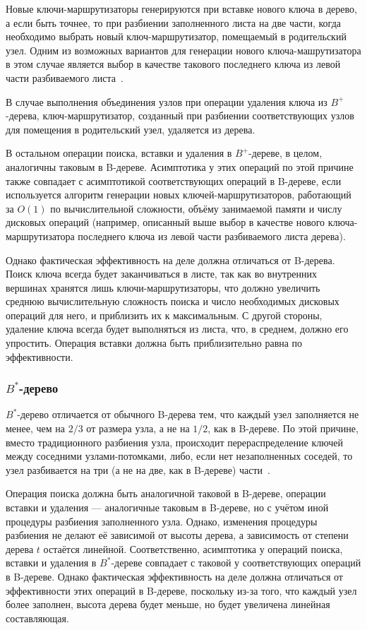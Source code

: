 \documentclass[a4paper,12pt]{article}
\begin{document}
	Новые ключи-маршрутизаторы генерируются при вставке нового ключа в дерево, а если быть точнее, то при разбиении заполненного листа на две части, когда необходимо выбрать новый ключ-маршрутизатор, помещаемый в родительский узел. Одним из возможных вариантов для генерации нового ключа-машрутизатора в этом случае является выбор в качестве такового последнего ключа из левой части разбиваемого листа~\cite{Kerttu}.
	
	В случае выполнения объединения узлов при операции удаления ключа из $B^+$-дерева, ключ-маршрутизатор, созданный при разбиении соответствующих узлов для помещения в родительский узел, удаляется из дерева.
	
	В остальном операции поиска, вставки и удаления в $B^+$-дереве, в целом, аналогичны таковым в B-дереве. Асимптотика у этих операций по этой причине также совпадает с асимптотикой соответствующих операций в B-дереве, если используется алгоритм генерации новых ключей-маршрутизаторов, работающий за $O(1)$ по вычислительной сложности, объёму занимаемой памяти и числу дисковых операций (например, описанный выше выбор в качестве нового ключа-маршрутизатора последнего ключа из левой части разбиваемого листа дерева).
	
	Однако фактическая эффективность на деле должна отличаться от B-дерева. Поиск ключа всегда будет заканчиваться в листе, так как во внутренних вершинах хранятся лишь ключи-маршрутизаторы, что должно увеличить среднюю вычислительную сложность поиска и число необходимых дисковых операций для него, и приблизить их к максимальным. С другой стороны, удаление ключа всегда будет выполняться из листа, что, в среднем, должно его упростить. Операция вставки должна быть приблизительно равна по эффективности.
	
	\subsubsection{$B^*$-дерево}
	
	$B^*$-дерево отличается от обычного B-дерева тем, что каждый узел заполняется не менее, чем на $2/3$ от размера узла, а не на $1/2$, как в B-дереве. По этой причине, вместо традиционного разбиения узла, происходит перераспределение ключей между соседними узлами-потомками, либо, если нет незаполненных соседей, то узел разбивается на три (а не на две, как в B-дереве) части~\cite{Nist}.
	
	Операция поиска должна быть аналогичной таковой в B-дереве, операции вставки и удаления --- аналогичные таковым в B-дереве, но с учётом иной процедуры разбиения заполненного узла. Однако, изменения процедуры разбиения не делают её зависимой от высоты дерева, а зависимость от степени дерева $t$ остаётся линейной. Соответственно, асимптотика у операций поиска, вставки и удаления в $B^*$-дереве совпадает с таковой у соответствующих операций в B-дереве. Однако фактическая эффективность на деле должна отличаться от эффективности этих операций в B-дереве, поскольку из-за того, что каждый узел более заполнен, высота дерева будет меньше, но будет увеличена линейная составляющая.
	
\end{document}
